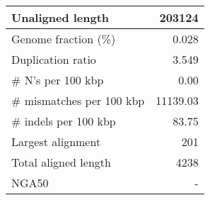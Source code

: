 \documentclass[12pt,a4paper]{article}
\begin{document}
\begin{table}[ht]
\begin{center}
\begin{tabular}{|l*{1}{|r}|}
Unaligned length & 203124 \\ \hline
Genome fraction (\%) & 0.028 \\ \hline
Duplication ratio & 3.549 \\ \hline
\# N's per 100 kbp & 0.00 \\ \hline
\# mismatches per 100 kbp & 11139.03 \\ \hline
\# indels per 100 kbp & 83.75 \\ \hline
Largest alignment & 201 \\ \hline
Total aligned length & 4238 \\ \hline
NGA50 & - \\ \hline
\end{tabular}
\end{center}
\end{table}
\end{document}
